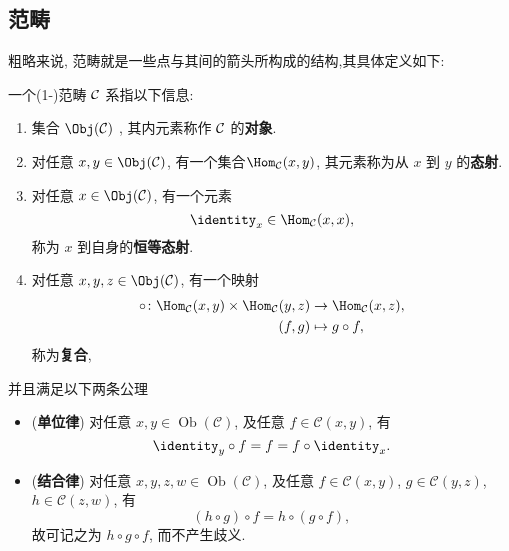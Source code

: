 \subsection{范畴}
粗略来说, 范畴就是一些点与其间的箭头所构成的结构,其具体定义如下:
\begin{definition}[(1-)范畴]\label{定义:1-范畴}
    一个(1-)范畴 $\cal{C}$ 系指以下信息:
    \begin{enumerate}
        \item 集合 $\Obj(\cal{C})$ , 其内元素称作 $\cal{C}$ 的\textbf{对象}.
        \item 对任意 $x, y \in \Obj (\mathcal{C})$, 有一个集合$\Hom_{\mathcal{C}} (x, y)$, 其元素称为从 $x$ 到 $y$ 的\textbf{态射}.
        \item 对任意 $x \in \Obj (\mathcal{C})$,
            有一个元素
            \[
                \identity_x \in \Hom_{\mathcal{C}} (x, x),
            \]
            称为 $x$ 到自身的\textbf{恒等态射}.
        \item 对任意 $x, y, z \in \Obj (\mathcal{C})$,
            有一个映射
            \begin{align*}
                \circ \colon
                \Hom_{\mathcal{C}} (x, y) \times \Hom_{\mathcal{C}} (y, z)
                & \to \Hom_{\mathcal{C}} (x, z), \\
                (f, g) & \mapsto g \circ f,
            \end{align*}
            称为\textbf{复合},
    \end{enumerate}
    并且满足以下两条公理
     \begin{itemize}
        \item
            (\textbf{单位律})
            对任意 $x, y \in \operatorname{Ob} (\mathcal{C})$,
            及任意 $f \in \mathcal{C} (x, y)$, 有
            \[
                \identity_y \circ f = f = f \circ \identity_x.
            \]
        \item
            (\textbf{结合律})
            对任意 $x, y, z, w \in \operatorname{Ob} (\mathcal{C})$,
            及任意 $f \in \mathcal{C} (x, y)$,
            $g \in \mathcal{C} (y, z)$, 
            $h \in \mathcal{C} (z, w)$, 有
            \[
                (h \circ g) \circ f = h \circ (g \circ f),
            \]
            故可记之为 $h \circ g \circ f$, 而不产生歧义.
    \end{itemize}
\end{definition}
